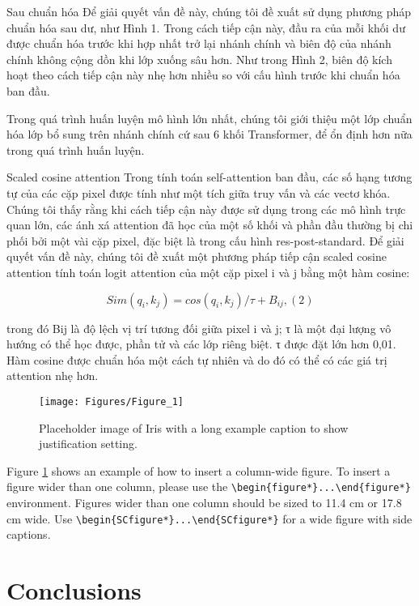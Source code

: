 \documentclass[times, twoside]{zHenriquesLab-StyleBioRxiv}
\begin{document}
Sau chuẩn hóa Để giải quyết vấn đề này, chúng tôi đề xuất sử dụng phương pháp chuẩn hóa sau dư, như Hình 1. Trong cách tiếp cận này, đầu ra của mỗi khối dư được chuẩn hóa trước khi hợp nhất trở lại nhánh chính và biên độ của nhánh chính không cộng dồn khi lớp xuống sâu hơn. Như trong Hình 2, biên độ kích hoạt theo cách tiếp cận này nhẹ hơn nhiều so với cấu hình trước khi chuẩn hóa ban đầu.

Trong quá trình huấn luyện mô hình lớn nhất, chúng tôi giới thiệu một lớp chuẩn hóa lớp bổ sung trên nhánh chính cứ sau 6 khối Transformer, để ổn định hơn nữa trong quá trình huấn luyện.

Scaled cosine attention Trong tính toán self-attention ban đầu, các số hạng tương tự của các cặp pixel được tính như một tích giữa truy vấn và các vectơ khóa. Chúng tôi thấy rằng khi cách tiếp cận này được sử dụng trong các mô hình trực quan lớn, các ánh xá attention đã học của một số khối và phần đầu thường bị chi phối bởi một vài cặp pixel, đặc biệt là trong cấu hình res-post-standard. Để giải quyết vấn đề này, chúng tôi đề xuất một phương pháp tiếp cận scaled cosine attention tính toán logit attention của một cặp pixel i và j bằng một hàm cosine:

$$Sim(q_{i}, k_{j}) = cos(q_{i}, k_{j})/\tau + B_{ij}, (2)$$

trong đó Bij là độ lệch vị trí tương đối giữa pixel i và j; τ là một đại lượng vô hướng có thể học được, phần tử và các lớp riêng biệt. τ được đặt lớn hơn 0,01. Hàm cosine được chuẩn hóa một cách tự nhiên và do đó có thể có các giá trị attention nhẹ hơn.

\begin{figure}%
    \centering
    \texttt{[image: Figures/Figure\_1]}
    \caption{Placeholder image of Iris with a long example caption to show justification setting.}
    \label{fig:computerNo}
\end{figure}


Figure \ref{fig:computerNo} shows an example of how to insert a column-wide figure. To insert a figure wider than one column, please use the \verb|\begin{figure*}...\end{figure*}| environment. Figures wider than one column should be sized to 11.4 cm or 17.8 cm wide. Use \verb|\begin{SCfigure*}...\end{SCfigure*}| for a wide figure with side captions.

\section*{Conclusions}
\end{document}
